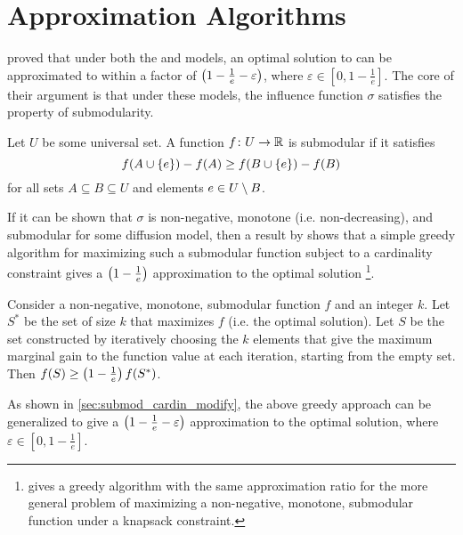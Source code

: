 \section{Approximation Algorithms}
\label{sec:approx_algs}
\citet{kempe2003maximizing} proved that under both the \ltmodel{} and \icmodel{} models, an optimal solution to \infmax{} can be approximated
to within a factor of $\left( 1 - \frac{1}{e} - \varepsilon \right)$, where $\varepsilon \in [0, 1 - \frac{1}{e}]$. The core of their argument is that
under these models, the influence function $\sigma$ satisfies the property of submodularity. 

\begin{definition}[Submodularity]
    Let $U$ be some universal set. A function $f\colon U \to \mathbb{R}$ is submodular if it satisfies 
    \begin{equation}
        f \! \left( A \cup \left\{ e \right\} \right) - f \! \left( A \right) \geq  f \! \left( B \cup \left\{ e \right\} \right) - f \! \left( B \right)
        \label{eq:submod}
    \end{equation} 
    for all sets $A \subseteq B \subseteq U$ and elements $e \in U \setminus B$.
    \label{def:submod} 
\end{definition}
 
If it can be shown that $\sigma$ is non-negative, monotone (i.e.\! non-decreasing), and submodular for some diffusion model, then a result by \citet{nemhauser1978analysis} shows that a simple greedy algorithm for maximizing such a submodular function subject to a cardinality constraint gives a $\left( 1 - \frac{1}{e} \right)$ approximation 
to the optimal solution \footnote{\cite{sviridenko2004note} gives a greedy algorithm with the same approximation ratio for the more general problem of maximizing a non-negative, monotone, submodular function under a knapsack constraint.}. 

\begin{theorem}
    Consider a non-negative, monotone, submodular function $f$ and an integer $k$. Let $S^*$ be the set of size $k$ that maximizes $f$ (i.e.\! the optimal solution). 
    Let $S$ be the set constructed by iteratively choosing the $k$ elements that give the maximum marginal gain to the function value at each iteration, starting from the empty set. Then $f \! \left( S \right) \geq \left( 1 - \frac{1}{e} \right)f \! \left( S^* \right)$. 
    \label{thm:submod_cardin}
\end{theorem}

As shown in \cref{sec:submod_cardin_modify}, the above greedy approach can be generalized
to give a $\left( 1 - \frac{1}{e} - \varepsilon \right)$ approximation to the optimal solution, where $\varepsilon \in [0, 1 - \frac{1}{e}]$. 


